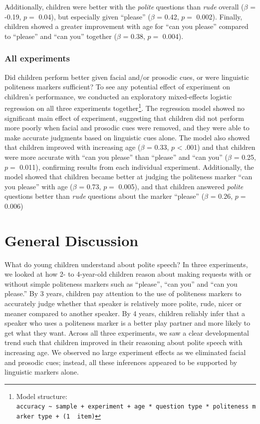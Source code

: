 \documentclass[oneside]{report}
\begin{document}
Additionally, children were better with the \emph{polite} questions than
\emph{rude} overall (\(\beta\) = -0.19, \(p =\) 0.04), but especially
given ``please'' (\(\beta\) = 0.42, \(p =\) 0.002). Finally, children
showed a greater improvement with age for ``can you please'' compared to
``please'' and ``can you'' together (\(\beta\) = 0.38, \(p =\) 0.004).

\subsubsection{All experiments}\label{all-experiments}

Did children perform better given facial and/or prosodic cues, or were
linguistic politeness markers sufficient? To see any potential effect of
experiment on children's performance, we conducted an exploratory
mixed-effects logistic regression on all three experiments
together\footnote{Model structure:
  \texttt{accuracy\ \textasciitilde{}\ sample\ +\ experiment\ +\ age\ *\ question\ type\ *\ politeness\ marker\ type\ +\ (1\ \textbar{}\ item)}}.
The regression model showed no significant main effect of experiment,
suggesting that children did not perform more poorly when facial and
prosodic cues were removed, and they were able to make accurate
judgments based on linguistic cues alone. The model also showed that
children improved with increasing age (\(\beta\) = 0.33, \(p\)
\textless{} .001) and that children were more accurate with ``can you
please'' than ``please'' and ``can you'' (\(\beta\) = 0.25, \(p =\)
0.011), confirming results from each individual experiment.
Additionally, the model showed that children became better at judging
the politeness marker ``can you please'' with age (\(\beta\) = 0.73,
\(p =\) 0.005), and that children answered \emph{polite} questions
better than \emph{rude} questions about the marker ``please'' (\(\beta\)
= 0.26, \(p =\) 0.006)

\section{General Discussion}\label{general-discussion}

What do young children understand about polite speech? In three
experiments, we looked at how 2- to 4-year-old children reason about
making requests with or without simple politeness markers such as
``please'', ``can you'' and ``can you please.'' By 3 years, children pay
attention to the use of politeness markers to accurately judge whether
that speaker is relatively more polite, rude, nicer or meaner compared
to another speaker. By 4 years, children reliably infer that a speaker
who uses a politeness marker is a better play partner and more likely to
get what they want. Across all three experiments, we saw a clear
developmental trend such that children improved in their reasoning about
polite speech with increasing age. We observed no large experiment
effects as we eliminated facial and prosodic cues; instead, all these
inferences appeared to be supported by linguistic markers alone.
\end{document}

